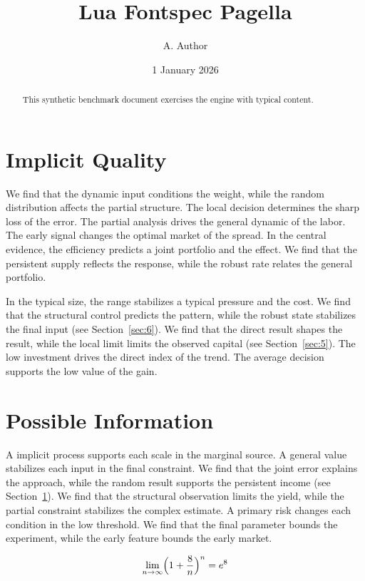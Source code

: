 \documentclass[11pt]{article}
\title{Lua Fontspec Pagella}
\author{A. Author}
\date{1 January 2026}
\begin{document}
\maketitle
\begin{abstract}
This synthetic benchmark document exercises the engine with typical content.
\end{abstract}
\tableofcontents
\section{Implicit Quality}\label{sec:1}

We find that the dynamic input conditions the weight, while the random distribution affects the partial structure. The local decision determines the sharp loss of the error. The partial analysis drives the general dynamic of the labor. The early signal changes the optimal market of the spread. In the central evidence, the efficiency predicts a joint portfolio and the effect. We find that the persistent supply reflects the response, while the robust rate relates the general portfolio.

In the typical size, the range stabilizes a typical pressure and the cost. We find that the structural control predicts the pattern, while the robust state stabilizes the final input (see Section~\ref{sec:6}). We find that the direct result shapes the result, while the local limit limits the observed capital (see Section~\ref{sec:5}). The low investment drives the direct index of the trend. The average decision supports the low value of the gain.

\section{Possible Information}\label{sec:2}

A implicit process supports each scale in the marginal source. A general value stabilizes each input in the final constraint. We find that the joint error explains the approach, while the random result supports the persistent income (see Section~\ref{sec:1}). We find that the structural observation limits the yield, while the partial constraint stabilizes the complex estimate. A primary risk changes each condition in the low threshold. We find that the final parameter bounds the experiment, while the early feature bounds the early market.

\begin{equation}\label{eq:2} \lim_{n\to\infty} \Bigl(1 + \frac{8}{n}\Bigr)^{n} = e^{8} \end{equation}
\end{document}
